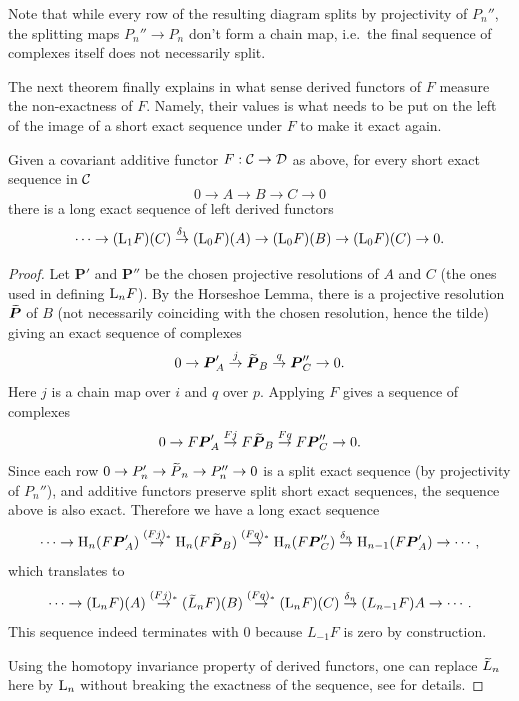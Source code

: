 \begin{rem}
    Note that while every row of the resulting diagram splits by projectivity of $P_n''$, the splitting maps $P_n''\to P_n$ don't form a chain map, i.e.\ the final sequence of complexes itself does not necessarily split.
\end{rem}

The next theorem finally explains in what sense derived functors of $F$ measure the non-exactness of $F$. Namely, their values is what needs to be put on the left of the image of a short exact sequence under $F$ to make it exact again.

\begin{thm}
    Given a covariant additive functor $F:\mathcal{C}\to\mathcal{D}$ as above, for every short exact sequence in $\mathcal{C}$
    \[0\to A\to B\to C\to 0\]
    there is a long exact sequence of left derived functors
    \[
    \cdots \to (\mathrm{L}_1 F)(C)\overset{\delta_1}\to (\mathrm{L}_0 F)(A)\to (\mathrm{L}_0 F)(B)\to (\mathrm{L}_0 F)(C)\to 0.
    \]
\end{thm}
\begin{proof}
     Let $\bm{P}'$ and $\bm{P}''$ be the chosen projective resolutions of $A$ and $C$ (the ones used in defining $\mathrm{L}_nF$). By the Horseshoe Lemma, there is a projective resolution $\wt{\bm{P}}$ of $B$ (not necessarily coinciding with the chosen resolution, hence the tilde) giving an exact sequence of complexes
     \[0\to \bm{P}'_{A}\overset j\to \wt{\bm{P}}_B \overset q\to \bm{P}''_{C}\to 0.\]
     Here $j$ is a chain map over $i$ and $q$ over $p$. Applying $F$ gives a sequence of complexes 
     \[0\to F\bm{P}'_{A}\overset {Fj}\to F\wt{\bm{P}}_B \overset {Fq}\to F\bm{P}''_{C}\to 0.\]
     Since each row $0\to P_n' \to \wt{P}_n\to P_n''\to 0$ is a split exact sequence (by projectivity of $P_{n}''$), and additive functors preserve split short exact sequences, the sequence above is also exact. Therefore we have a long exact sequence
     \[\cdots\to \rmH_n(F\bm{P}'_{A})\overset{(Fj)_\ast}\to \rmH_n(F\wt{\bm{P}}_B) \overset {(Fq)_\ast}\to \rmH_n(F\bm{P}''_{C})\overset{\delta_n}\to \rmH_{n-1}(F\bm{P}'_{A})\to \cdots,\]
     which translates to
     \[\cdots\to (\rmL_nF)(A)\overset{(Fj)_\ast}\to (\wt{L}_n F)(B)\overset{(Fq)_\ast}\to (\rmL_nF)(C)\overset{\delta_n}\to (L_{n-1}F)A\to \cdots. \]
     This sequence indeed terminates with $0$ because $L_{-1}F$ is zero by construction.
     
     Using the homotopy invariance property of derived functors, one can replace $\wt{L}_n$ here by $\mathrm{L}_n$ without breaking the exactness of the sequence, see \cite[Thm. 6.27]{Rotman} for details.
\end{proof}


